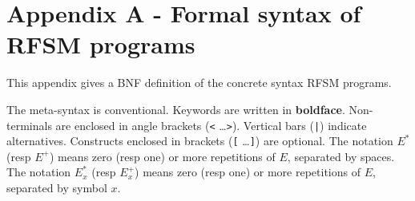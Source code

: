 \chapter*{Appendix A - Formal syntax of RFSM programs}
\label{cha:bnf}

This appendix gives a BNF definition of the concrete syntax RFSM programs.

\medskip
The meta-syntax is conventional. Keywords are written in \textbf{boldface}.  Non-terminals are
enclosed in angle brackets ({\tt <} \ldots {\tt >}).  Vertical bars ({\tt |}) indicate
alternatives.  Constructs enclosed in brackets ({\tt [} \ldots {\tt ]}) are optional.
The notation $E^*$ (resp $E^+$) means zero (resp one) or more repetitions of $E$, separated by spaces.
The notation $E^*_x$ (resp $E^+_x$) means zero (resp one) or more repetitions of $E$, separated by
symbol $x$.



